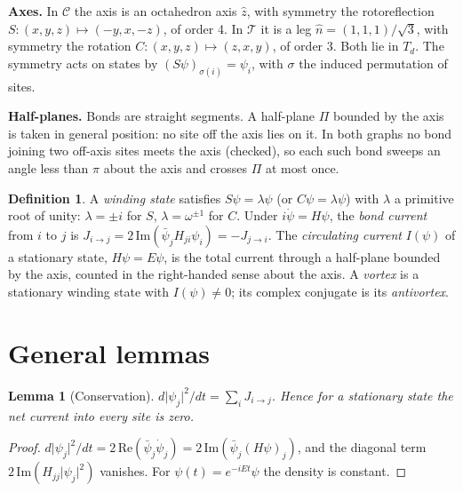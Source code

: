 \documentclass[twocolumn]{iopjournal}
\newtheorem{lemma}{Lemma}
\theoremstyle{definition}
\newtheorem{definition}{Definition}
\theoremstyle{remark}
\begin{document}
\textbf{Axes.} In $\mathcal C$ the axis is an octahedron axis $\hat z$,
with symmetry the rotoreflection $S:(x,y,z)\mapsto(-y,x,-z)$, of order
4. In $\mathcal T$ it is a leg $\hat n = (1,1,1)/\sqrt3$, with symmetry
the rotation $C:(x,y,z)\mapsto(z,x,y)$, of order 3. Both lie in $T_d$.
The symmetry acts on states by $(S\psi)_{\sigma(i)} = \psi_i$, with
$\sigma$ the induced permutation of sites.

\textbf{Half-planes.} Bonds are straight segments. A half-plane $\Pi$
bounded by the axis is taken in general position: no site off the axis
lies on it. In both graphs no bond joining two off-axis sites meets the
axis (checked), so each such bond sweeps an angle less than $\pi$ about
the axis and crosses $\Pi$ at most once.

\begin{definition}
A \emph{winding state} satisfies $S\psi = \lambda\psi$ (or
$C\psi = \lambda\psi$) with $\lambda$ a primitive root of unity:
$\lambda = \pm i$ for $S$, $\lambda = \omega^{\pm1}$ for $C$. Under
$i\dot\psi = H\psi$, the \emph{bond current} from $i$ to $j$ is
$J_{i\to j} = 2\,\mathrm{Im}(\bar\psi_jH_{ji}\psi_i) = -J_{j\to i}$.
The \emph{circulating current} $I(\psi)$ of a stationary state,
$H\psi = E\psi$, is the total current through a half-plane bounded by
the axis, counted in the right-handed sense about the axis. A
\emph{vortex} is a stationary winding state with $I(\psi) \neq 0$; its
complex conjugate is its \emph{antivortex}.
\end{definition}


\section{General lemmas}

\begin{lemma}[Conservation]
$d\lvert\psi_j\rvert^2/dt = \sum_i J_{i\to j}$. Hence for a stationary
state the net current into every site is zero.
\end{lemma}

\begin{proof}
$d\lvert\psi_j\rvert^2/dt = 2\,\mathrm{Re}(\bar\psi_j\dot\psi_j)
= 2\,\mathrm{Im}(\bar\psi_j(H\psi)_j)$, and the diagonal term
$2\,\mathrm{Im}(H_{jj}\lvert\psi_j\rvert^2)$ vanishes. For
$\psi(t) = e^{-iEt}\psi$ the density is constant.
\end{proof}
\end{document}
